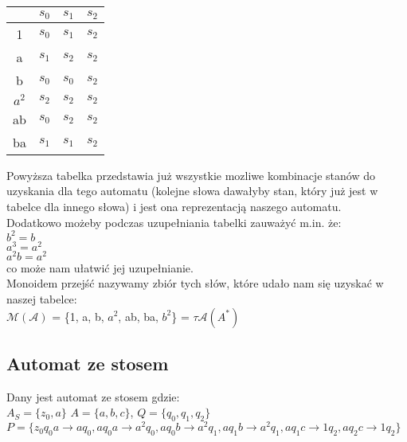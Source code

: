 \documentclass[main.tex]{subfiles}
\begin{document}
    \begin{table}[H]
        \centering
        \begin{tabular}{|c|l|l|l|}
            \hline
            & $s_{0}$ & $s_{1}$ & $s_{2}$ \\ \hline
            1 & $s_{0}$ & $s_{1}$ & $s_{2}$ \\ \hline
            a & $s_{1}$ & $s_{2}$ & $s_{2}$ \\ \hline
            b & $s_{0}$ & $s_{0}$ & $s_{2}$ \\ \hline
            $a^2$  & $s_{2}$ & $s_{2}$ & $s_{2}$ \\ \hline
            ab & $s_{0}$ & $s_{2}$ & $s_{2}$ \\ \hline
            ba & $s_{1}$ & $s_{1}$ & $s_{2}$ \\ \hline
        \end{tabular}
    \end{table}

    \noindent Powyższa tabelka przedstawia już wszystkie mozliwe kombinacje stanów do uzyskania dla tego automatu (kolejne słowa dawałyby stan, który już jest w tabelce dla innego słowa) i jest ona reprezentacją naszego automatu. \\

    \noindent Dodatkowo możeby podczas uzupełniania tabelki zauważyć m.in. że: \\
    $b^2 = b$ \\
    $a^3 = a^2$ \\
    $a^{2}b = a^2$ \\
    co może nam ułatwić jej uzupełnianie. \\

    \noindent Monoidem przejść nazywamy zbiór tych słów, które udało nam się uzyskać w naszej tabelce: \\
    $\mathcal{M(A)}$ = \{1, a, b, $a^2$, ab, ba, $b^2$\} = $\tau \mathcal{A}(A^{*})$

    \subsection{Automat ze stosem}
    Dany jest automat ze stosem gdzie: \\
    $A_{S} = \{z_{0}, a\}$ $A = \{a, b, c\}$, $Q = \{q_{0}, q_{1}, q_{2}\}$ \\
    $P = \{z_{0}q_{0}a \rightarrow aq_{0}, aq_{0}a \rightarrow a^2 q_{0}, aq_{0}b \rightarrow a^2 q_{1}, aq_{1}b \rightarrow a^2 q_{1}, aq_{1}c \rightarrow 1q_{2}, aq_{2}c \rightarrow 1q_{2}\}$ \\
\end{document}
